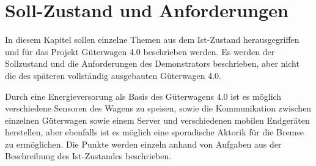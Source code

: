 \section{Soll-Zustand und Anforderungen}
In diesem Kapitel sollen einzelne Themen aus dem Ist-Zustand herausgegriffen und für das Projekt Güterwagen 4.0 beschrieben werden. Es werden der Sollzustand und die Anforderungen des Demonstrators beschrieben, aber nicht die des späteren vollständig ausgebauten Güterwagen 4.0.\par
Durch eine Energieversorung als Basis des Güterwagens 4.0 ist es möglich verschiedene Sensoren des Wagens zu speisen, sowie die Kommunikation zwischen einzelnen Güterwagen sowie einem Server und verschiedenen mobilen Endgeräten herstellen, aber ebenfalls ist es möglich eine sporadische Aktorik für die Bremse zu ermöglichen. Die Punkte werden einzeln anhand von Aufgaben aus der Beschreibung des Ist-Zustandes beschrieben. \par

